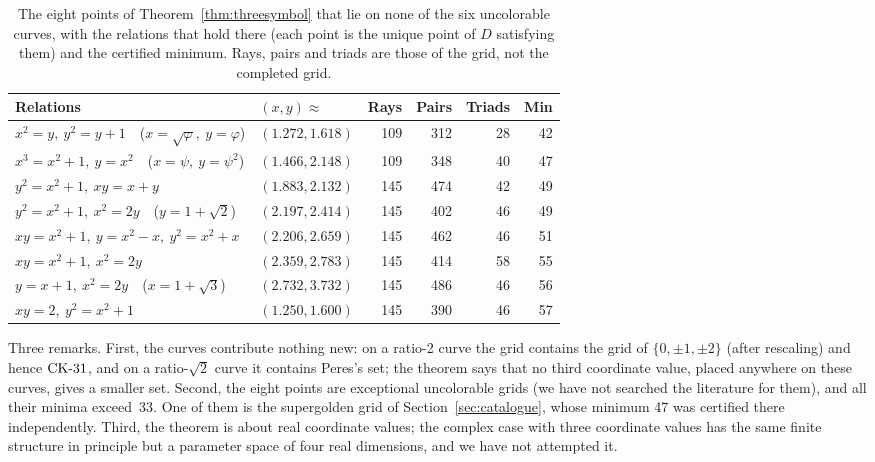 \begin{table}[t]
\centering
\caption{The eight points of Theorem~\ref{thm:threesymbol} that lie on none of the six
uncolorable curves, with the relations that hold there (each point is the unique point of $D$
satisfying them) and the certified minimum.  Rays, pairs and triads are those of the grid, not the completed grid.}
\label{tab:threesymbol}
\small
\begin{tabular}{@{}llrrrr@{}}
\toprule
Relations & $(x,y)\approx$ & Rays & Pairs & Triads & Min \\
\midrule
$x^2=y,\ y^2=y+1$\ \ ($x=\sqrt\varphi,\ y=\varphi$) & $(1.272,1.618)$ & 109 & 312 & 28 & 42 \\
$x^3=x^2+1,\ y=x^2$\ \ ($x=\psi,\ y=\psi^2$) & $(1.466,2.148)$ & 109 & 348 & 40 & 47 \\
$y^2=x^2+1,\ xy=x+y$ & $(1.883,2.132)$ & 145 & 474 & 42 & 49 \\
$y^2=x^2+1,\ x^2=2y$\ \ ($y=1+\sqrt2$) & $(2.197,2.414)$ & 145 & 402 & 46 & 49 \\
$xy=x^2+1,\ y=x^2-x,\ y^2=x^2+x$ & $(2.206,2.659)$ & 145 & 462 & 46 & 51 \\
$xy=x^2+1,\ x^2=2y$ & $(2.359,2.783)$ & 145 & 414 & 58 & 55 \\
$y=x+1,\ x^2=2y$\ \ ($x=1+\sqrt3$) & $(2.732,3.732)$ & 145 & 486 & 46 & 56 \\
$xy=2,\ y^2=x^2+1$ & $(1.250,1.600)$ & 145 & 390 & 46 & 57 \\
\bottomrule
\end{tabular}
\end{table}

Three remarks.  First, the curves contribute nothing new: on a ratio-2 curve the grid contains
the grid of $\{0,\pm1,\pm2\}$ (after rescaling) and hence $\mathrm{CK}\text{-}31$, and on a ratio-$\sqrt2$ curve
it contains Peres's set; the theorem says that no third coordinate value, placed anywhere on these curves,
gives a smaller set.  Second, the eight points are exceptional uncolorable grids (we have
not searched the literature for them), and all their minima exceed~33.  One of them is the supergolden grid of Section~\ref{sec:catalogue}, whose
minimum 47 was certified there independently.  Third, the theorem is about real coordinate values; the
complex case with three coordinate values has the same finite structure in principle but a parameter space of four
real dimensions, and we have not attempted it.
